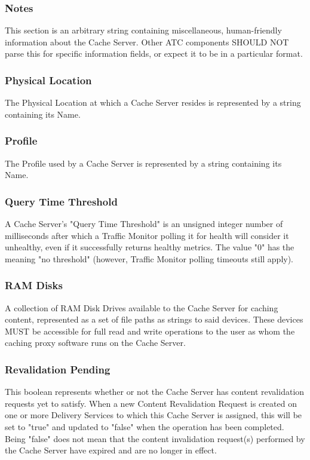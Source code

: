 \subsubsection{Notes}
This section is an arbitrary string containing miscellaneous, human-friendly
information about the Cache Server. Other ATC components SHOULD NOT parse this
for specific information fields, or expect it to be in a particular format.

\subsubsection{Physical Location}
The Physical Location at which a Cache Server resides is represented by a string
containing its Name.

\subsubsection{Profile}
The Profile used by a Cache Server is represented by a string containing its
Name.

\subsubsection{Query Time Threshold}
A Cache Server's "Query Time Threshold" is an unsigned integer number of
milliseconds after which a Traffic Monitor polling it for health will consider
it unhealthy, even if it successfully returns healthy metrics. The value "0" has
the meaning "no threshold" (however, Traffic Monitor polling timeouts still
apply).

\subsubsection{RAM Disks}
A collection of RAM Disk Drives available to the Cache Server for caching
content, represented as a set of file paths as strings to said devices. These
devices MUST be accessible for full read and write operations to the user as
whom the caching proxy software runs on the Cache Server.

\subsubsection{Revalidation Pending}
This boolean represents whether or not the Cache Server has content revalidation
requests yet to satisfy. When a new Content Revalidation Request is created on
one or more Delivery Services to which this Cache Server is assigned, this will
be set to "true" and updated to "false" when the operation has been completed.
Being "false" does not mean that the content invalidation request(s) performed
by the Cache Server have expired and are no longer in effect.

